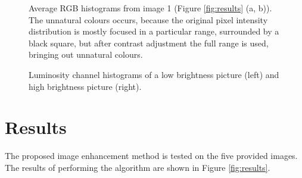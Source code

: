 \documentclass[journal,transmag]{IEEEtran}
\begin{document}
\begin{figure}[h!]
	\centering
\caption{Average RGB histograms from image 1 (Figure \ref{fig:results} (a, b)).  The unnatural colours occurs, because the original pixel intensity distribution is mostly focused in a particular range, surrounded by a black square, but after contrast adjustment the full range is used, bringing out unnatural colours.}
\label{fig:image01_hists}
\end{figure}

\begin{figure}[h!]
	\centering
	\caption{Luminosity channel histograms of a low brightness picture (left) and high brightness picture (right).}
	\label{fig:luminDiffHist}
\end{figure}

\section{Results}
\label{sec:results}
The proposed image enhancement method is tested on the five provided images. The results of performing the algorithm are shown in Figure \ref{fig:results}.
\end{document}
